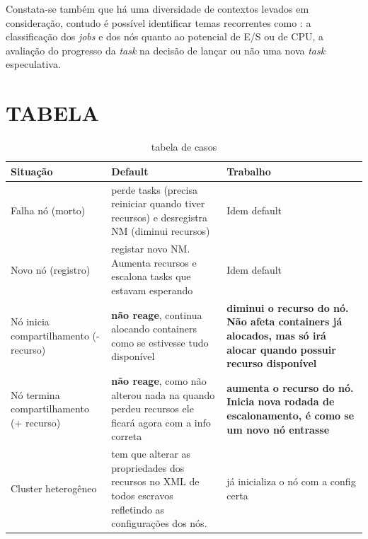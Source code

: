 Constata-se também que há uma diversidade de contextos levados em consideração, contudo é possível identificar temas recorrentes como : a classificação dos \emph{jobs} e dos nós quanto ao potencial de E/S ou de CPU, a avaliação do progresso da \emph{task} na decisão de lançar ou não uma nova \emph{task} especulativa.


\section{TABELA}
\begin{table}
	\centering
	\begin{tabular}{|p{3.0cm}|p{6.0cm}|p{6.0cm}|}
		\hline
		Situação & Default & Trabalho \\
		\hline
		Falha nó (morto) & perde tasks (precisa reiniciar quando tiver recursos) e desregistra NM (diminui recursos) & Idem default\\
		\hline
		Novo nó (registro) & registar novo NM. Aumenta recursos e escalona tasks que estavam esperando & Idem default\\
		\hline
		Nó inicia compartilhamento (- recurso) & \textbf{não reage}, continua alocando containers como se estivesse tudo disponível & \textbf{diminui o recurso do nó. Não afeta containers já alocados, mas só irá alocar quando possuir recurso disponível}\\
		\hline
		Nó termina compartilhamento (+ recurso) &\textbf{não reage}, como não alterou nada na quando perdeu recursos ele ficará agora com a info correta & \textbf{aumenta o recurso do nó. Inicia nova rodada de escalonamento, é como se um novo nó entrasse}\\
		\hline
		Cluster heterogêneo & tem que alterar as propriedades dos recursos no XML de todos escravos refletindo as configurações dos nós. & já inicializa o nó com a config certa\\
		\hline
		
	\end{tabular}
	\caption{tabela de casos}
	\label{tab:memory allocation}
\end{table}

